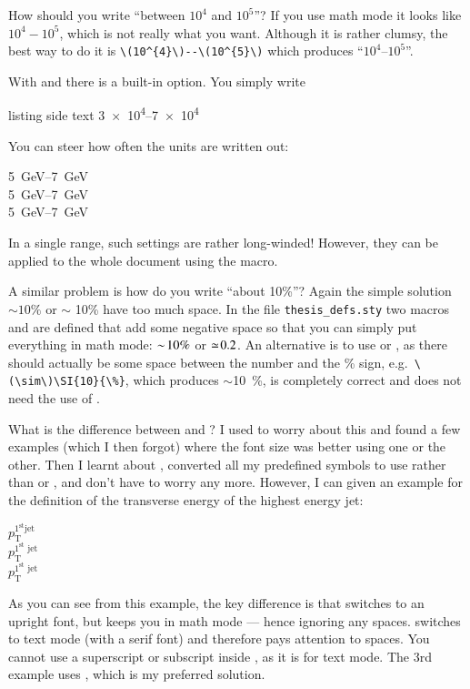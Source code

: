 How should you write \enquote{between \(10^{4}\) and \(10^{5}\)}?
If you use math mode it looks like \(10^{4} - 10^{5}\), which is not
really what you want.
Although it is rather clumsy, the best way to do
it is \verb+\(10^{4}\)--\(10^{5}\)+ which produces
\enquote{\(10^{4}\)--\(10^{5}\)}.

With  and  there is a built-in option.
You simply write
\begin{tcblisting}{listing side text}
\numrange{3e4}{7e4}
\end{tcblisting}
You can steer how often the units are written out:
\begin{tcblisting}{}
\SIrange[range-units=repeat, range-phrase=--]{5}{7}{\GeV}\\
\SIrange[range-units=single, range-phrase=--]{5}{7}{\GeV}\\
\SIrange[range-units=brackets, range-phrase=--]{5}{7}{\GeV}
\end{tcblisting}
In a single range, such settings are rather long-winded!
However, they can be applied to the whole
document using the  macro.

A similar problem is how do you write \enquote{about 10\%}?  Again the
simple solution \(\sim 10\%\) or \(\sim\) 10\% have too much space. In the
file \texttt{thesis\_defs.sty} two macros  and
 are defined that add some negative space so that you
can simply put everything in math mode: \(\sim\! 10\%\) or \(\simeq\! 0.2\).
An alternative is to use  or , as there
should actually be some space between the number and the \% sign,
e.g.\ \verb+\(\sim\)\SI{10}{\%}+, which produces \(\sim\)\SI{10}{\%}, is
completely correct and does not need the use of .

What is the difference between  and
? I used to worry about this and found a
few examples (which I then forgot) where the font size was better
using one or the other. Then I learnt about ,
converted all my predefined symbols to use  rather than
 or , and don't have to worry any
more. However, I can given an example for the definition
of the transverse energy of the highest energy jet:
\begin{tcblisting}{}
\(p_{\mathrm{T}}^{\mathrm{1^{\text{st}} jet}}\)\\
\(p_{\textrm{T}}^{\textrm{1}^{\text{st}}\textrm{ jet}}\)\\
\(p_{\text{T}}^{1^{\text{st}}\text{ jet}}\)
\end{tcblisting}
As you can see
from this example, the key difference is that  switches
to an upright font, but keeps you in math mode --- hence ignoring any
spaces.
 switches to text mode (with a serif font) and
therefore pays attention to spaces.
You cannot use a superscript or subscript inside ,
as it is for text mode.
The 3rd example uses , which is my preferred solution.

